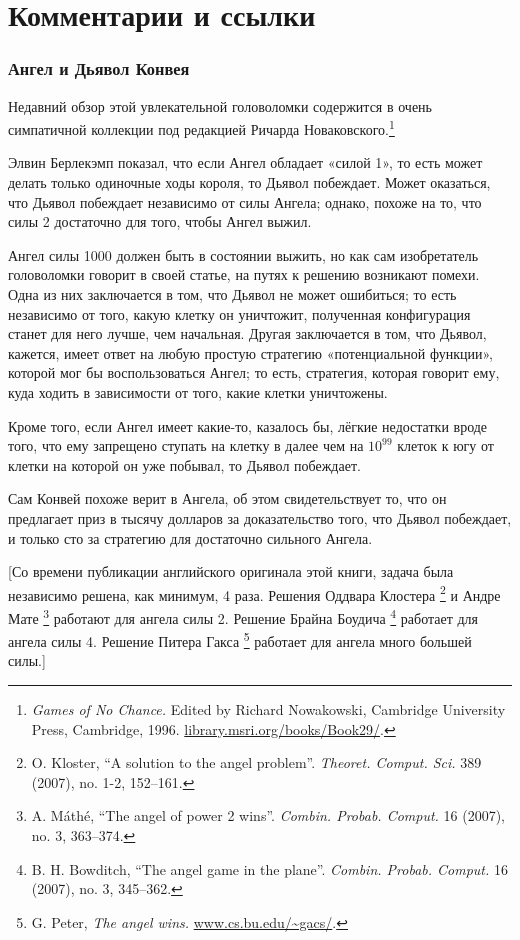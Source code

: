 \section*{Комментарии и ссылки}

\subsubsection*{Ангел и Дьявол Конвея}

Недавний обзор этой увлекательной головоломки содержится в очень симпатичной коллекции под редакцией Ричарда Новаковского.\footnote{\emph{Games of No Chance.} Edited by Richard Nowakowski, Cambridge University Press, Cambridge, 1996. \href{http://library.msri.org/books/Book29/}{\url{library.msri.org/books/Book29/}}.} 

Элвин Берлекэмп показал, что если Ангел обладает «силой 1», то есть может делать только одиночные ходы короля, то Дьявол побеждает.
Может оказаться, что Дьявол побеждает независимо от силы Ангела; 
однако, похоже на то, что силы 2 достаточно для того, чтобы Ангел выжил.

Ангел силы 1000 должен быть в состоянии выжить, но как сам изобретатель головоломки говорит в своей статье, на путях к решению возникают помехи.
Одна из них заключается в том, что Дьявол не может ошибиться;
то есть независимо от того, какую клетку он уничтожит, полученная конфигурация станет для него лучше, чем начальная.
Другая заключается в том, что Дьявол, кажется, имеет ответ на любую простую стратегию «потенциальной функции», которой мог бы воспользоваться Ангел;
то есть, стратегия, которая говорит ему, куда ходить в зависимости от того, какие клетки уничтожены. 

Кроме того, если Ангел имеет какие-то, казалось бы, лёгкие недостатки вроде того, что ему запрещено ступать на клетку в далее чем на $10^{99}$ клеток к югу от клетки на которой он уже побывал, то Дьявол побеждает.

Сам Конвей похоже верит в Ангела, об этом свидетельствует то, что он предлагает приз в тысячу долларов за доказательство того, что Дьявол побеждает, и только сто за стратегию для достаточно сильного Ангела.

[Со времени публикации английского оригинала этой книги, задача была независимо решена, как минимум, 4 раза.
Решения Оддвара Клостера%
\footnote{
O. Kloster, 
``A solution to the angel problem''.
\emph{Theoret. Comput. Sci.} 389 (2007), no. 1-2, 152--161.}
и Андре Мате%
\footnote{
A. Máthé, 
``The angel of power 2 wins''. 
\emph{Combin. Probab. Comput.} 16 (2007), no. 3, 363–374.}
работают для ангела силы 2.
Решение Брайна Боудича%
\footnote{B. H. Bowditch, ``The angel game in the plane''. \emph{Combin. Probab. Comput.} 16 (2007), no. 3, 345--362.}
работает для ангела силы 4.
Решение Питера Гакса%
\footnote{G. Peter, \emph{The angel wins.} \href{https://www.cs.bu.edu/~gacs/papers/angel.pdf}{\url{www.cs.bu.edu/~gacs/}}.}
работает для ангела много большей силы.]

